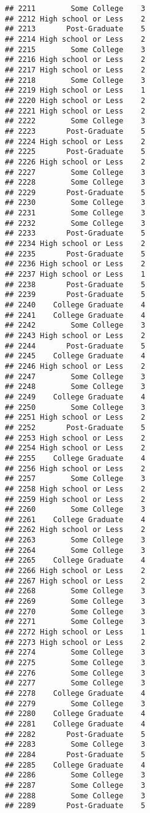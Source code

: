 \documentclass[
]{article}
\begin{document}
\begin{verbatim}
## 2211        Some College    3
## 2212 High school or Less    2
## 2213       Post-Graduate    5
## 2214 High school or Less    2
## 2215        Some College    3
## 2216 High school or Less    2
## 2217 High school or Less    2
## 2218        Some College    3
## 2219 High school or Less    1
## 2220 High school or Less    2
## 2221 High school or Less    2
## 2222        Some College    3
## 2223       Post-Graduate    5
## 2224 High school or Less    2
## 2225       Post-Graduate    5
## 2226 High school or Less    2
## 2227        Some College    3
## 2228        Some College    3
## 2229       Post-Graduate    5
## 2230        Some College    3
## 2231        Some College    3
## 2232        Some College    3
## 2233       Post-Graduate    5
## 2234 High school or Less    2
## 2235       Post-Graduate    5
## 2236 High school or Less    2
## 2237 High school or Less    1
## 2238       Post-Graduate    5
## 2239       Post-Graduate    5
## 2240    College Graduate    4
## 2241    College Graduate    4
## 2242        Some College    3
## 2243 High school or Less    2
## 2244       Post-Graduate    5
## 2245    College Graduate    4
## 2246 High school or Less    2
## 2247        Some College    3
## 2248        Some College    3
## 2249    College Graduate    4
## 2250        Some College    3
## 2251 High school or Less    2
## 2252       Post-Graduate    5
## 2253 High school or Less    2
## 2254 High school or Less    2
## 2255    College Graduate    4
## 2256 High school or Less    2
## 2257        Some College    3
## 2258 High school or Less    2
## 2259 High school or Less    2
## 2260        Some College    3
## 2261    College Graduate    4
## 2262 High school or Less    2
## 2263        Some College    3
## 2264        Some College    3
## 2265    College Graduate    4
## 2266 High school or Less    2
## 2267 High school or Less    2
## 2268        Some College    3
## 2269        Some College    3
## 2270        Some College    3
## 2271        Some College    3
## 2272 High school or Less    1
## 2273 High school or Less    2
## 2274        Some College    3
## 2275        Some College    3
## 2276        Some College    3
## 2277        Some College    3
## 2278    College Graduate    4
## 2279        Some College    3
## 2280    College Graduate    4
## 2281    College Graduate    4
## 2282       Post-Graduate    5
## 2283        Some College    3
## 2284       Post-Graduate    5
## 2285    College Graduate    4
## 2286        Some College    3
## 2287        Some College    3
## 2288        Some College    3
## 2289       Post-Graduate    5

\end{verbatim}
\end{document}
